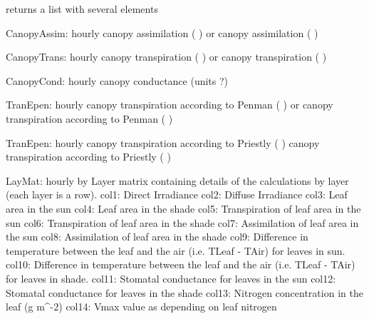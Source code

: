 \documentclass[letterpaper]{book}
\begin{document}
%
\begin{Value}

returns a list with several elements

CanopyAssim: hourly canopy assimilation ( ) or canopy
assimilation ( )

CanopyTrans: hourly canopy transpiration ( ) or canopy
transpiration ( )

CanopyCond: hourly canopy conductance (units ?)

TranEpen: hourly canopy transpiration according to Penman
( ) or canopy
transpiration according to Penman (
)

TranEpen: hourly canopy transpiration according to
Priestly ( )
canopy transpiration according to Priestly ( )

LayMat: hourly by Layer matrix containing details of the
calculations by layer (each layer is a row).  col1:
Direct Irradiance col2: Diffuse Irradiance col3: Leaf
area in the sun col4: Leaf area in the shade col5:
Transpiration of leaf area in the sun col6: Transpiration
of leaf area in the shade col7: Assimilation of leaf area
in the sun col8: Assimilation of leaf area in the shade
col9: Difference in temperature between the leaf and the
air (i.e. TLeaf - TAir) for leaves in sun.  col10:
Difference in temperature between the leaf and the air
(i.e. TLeaf - TAir) for leaves in shade.  col11: Stomatal
conductance for leaves in the sun col12: Stomatal
conductance for leaves in the shade col13: Nitrogen
concentration in the leaf (g m\textasciicircum{}-2) col14: Vmax value as
depending on leaf nitrogen
\end{Value}
%
\begin{Examples}
\end{Examples}
\end{document}
